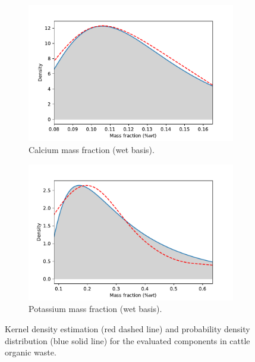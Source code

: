 \begin{refsection}[referencesCh3]
\begin{figure}[p]
	\begin{subfigure}[t]{0.45\textwidth}
		\includegraphics[width=\linewidth]{gfx/AppendixB/Ca_dist.pdf}
		\caption{Calcium mass fraction (wet basis).}
		\label{fig:Ca_KDE}
	\end{subfigure}
	\qquad
	\begin{subfigure}[t]{0.45\textwidth}
		\includegraphics[width=\linewidth]{gfx/AppendixB/K_dist.pdf}
		\caption{Potassium mass fraction (wet basis).}
		\label{fig:K_KDE}
	\end{subfigure}
	\caption{Kernel density estimation (red dashed line) and probability density distribution (blue solid line) for the evaluated components in cattle organic waste.}
	\label{fig:components_distributions}
\end{figure}


\end{refsection}
